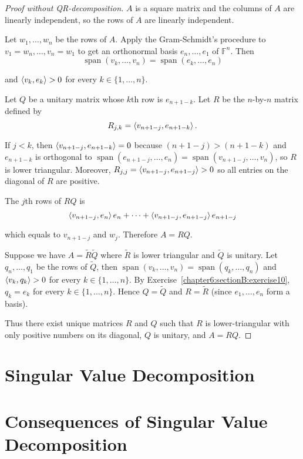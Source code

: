 \begin{proof}[Proof without QR-decomposition]
    $A$ is a square matrix and the columns of $A$ are linearly independent, so the rows of $A$ are linearly independent.

    Let $w_{1}, \ldots, w_{n}$ be the rows of $A$. Apply the Gram-Schmidt's procedure to $v_{1} = w_{n}, \ldots, v_{n} = w_{1}$ to get an orthonormal basis $e_{n}, \ldots, e_{1}$ of $\mathbb{F}^{n}$. Then
    \[
        \operatorname{span}(v_{k}, \ldots, v_{n}) = \operatorname{span}(e_{k}, \ldots, e_{n})
    \]

    and $\left\langle{v_{k}, e_{k}}\right\rangle > 0$ for every $k\in\{1,\ldots,n\}$.

    Let $Q$ be a unitary matrix whose $k$th row is $e_{n+1-k}$. Let $R$ be the $n$-by-$n$ matrix defined by
    \[
        R_{j,k} = \left\langle{v_{n+1-j}, e_{n+1-k}}\right\rangle.
    \]

    If $j < k$, then $\left\langle{v_{n+1-j}, e_{n+1-k}}\right\rangle = 0$ because $(n+1-j) > (n+1-k)$ and $e_{n+1-k}$ is orthogonal to $\operatorname{span}(e_{n+1-j}, \ldots, e_{n}) = \operatorname{span}(v_{n+1-j}, \ldots, v_{n})$, so $R$ is lower triangular. Moreover, $R_{j,j} = \left\langle{v_{n+1-j}, e_{n+1-j}}\right\rangle > 0$ so all entries on the diagonal of $R$ are positive.

    The $j$th rows of $RQ$ is
    \[
        \left\langle{v_{n+1-j}, e_{n}}\right\rangle e_{n} + \cdots + \left\langle{v_{n+1-j}, e_{n+1-j}}\right\rangle e_{n+1-j}
    \]

    which equals to $v_{n+1-j}$ and $w_{j}$. Therefore $A = RQ$.

    Suppose we have $A = \widetilde{R}\widetilde{Q}$ where $\widetilde{R}$ is lower triangular and $\widetilde{Q}$ is unitary. Let $q_{n}, \ldots, q_{1}$ be the rows of $\widetilde{Q}$, then $\operatorname{span}(v_{k}, \ldots, v_{n}) =  \operatorname{span}(q_{k}, \ldots, q_{n})$ and $\left\langle{v_{k}, q_{k}}\right\rangle > 0$ for every $k\in\{1,\ldots, n\}$. By Exercise~\ref{chapter6:sectionB:exercise10}, $q_{k} = e_{k}$ for every $k\in\{1,\ldots,n\}$. Hence $Q = \widetilde{Q}$ and $R = \widetilde{R}$ (since $e_{1},  \ldots, e_{n}$ form a basis).

    Thus there exist unique matrices $R$ and $Q$ such that $R$ is lower-triangular with only positive numbers on its diagonal, $Q$ is unitary, and $A = RQ$.
\end{proof}
\newpage

\section{Singular Value Decomposition}

\section{Consequences of Singular Value Decomposition}

